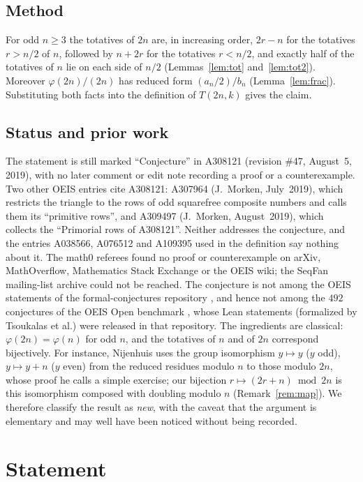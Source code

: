 \documentclass[11pt]{amsart}
\theoremstyle{plain}
\theoremstyle{definition}
\begin{document}
\subsection*{Method}
For odd $n\ge3$ the totatives of $2n$ are, in increasing order, $2r-n$ for the totatives $r>n/2$ of $n$, followed by $n+2r$ for the totatives $r<n/2$, and exactly half of the totatives of $n$ lie on each side of $n/2$ (Lemmas~\ref{lem:tot} and~\ref{lem:tot2}). Moreover $\varphi(2n)/(2n)$ has reduced form $(a_n/2)/b_n$ (Lemma~\ref{lem:frac}). Substituting both facts into the definition of $T(2n,k)$ gives the claim.

\subsection*{Status and prior work}
The statement is still marked ``Conjecture'' in A308121 (revision \#47, August~5, 2019), with no later comment or edit note recording a proof or a counterexample.
Two other OEIS entries cite A308121: A307964 \cite{A307964} (J.~Morken, July~2019), which restricts the triangle to the rows of odd squarefree composite numbers and calls them its ``primitive rows'', and A309497 \cite{A309497} (J.~Morken, August~2019), which collects the ``Primorial rows of A308121''. Neither addresses the conjecture, and the entries A038566, A076512 and A109395 used in the definition say nothing about it.
The math0 referees found no proof or counterexample on arXiv, MathOverflow, Mathematics Stack Exchange or the OEIS wiki; the SeqFan mailing-list archive could not be reached.
The conjecture is not among the OEIS statements of the formal-conjectures repository \cite{FC}, and hence not among the $492$ conjectures of the OEIS Open benchmark \cite{Ad}, whose Lean statements (formalized by Tsoukalas et al.) were released in that repository.
The ingredients are classical: $\varphi(2n)=\varphi(n)$ for odd $n$, and the totatives of $n$ and of $2n$ correspond bijectively. For instance, Nijenhuis \cite{Nij} uses the group isomorphism $y\mapsto y$ ($y$ odd), $y\mapsto y+n$ ($y$ even) from the reduced residues modulo $n$ to those modulo $2n$, whose proof he calls a simple exercise; our bijection $r\mapsto(2r+n)\bmod 2n$ is this isomorphism composed with doubling modulo $n$ (Remark~\ref{rem:map}).
We therefore classify the result as \emph{new}, with the caveat that the argument is elementary and may well have been noticed without being recorded.

\section{Statement}\label{sec:statement}
\end{document}
